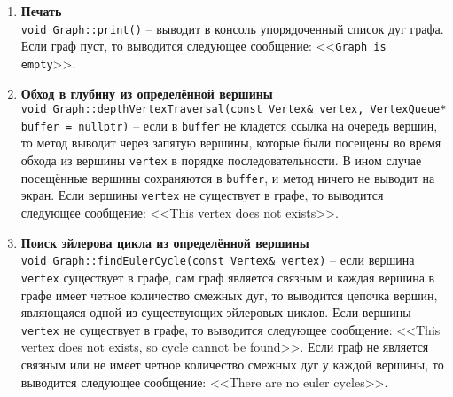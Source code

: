\begin{enumerate}
    \item \textbf{Печать} \\
    \texttt{void Graph::print()} -- выводит в консоль упорядоченный список дуг графа. Если граф пуст, то выводится следующее сообщение: <<\texttt{Graph is empty}>>.

    \item \textbf{Обход в глубину из определённой вершины} \\
    \texttt{void Graph::depthVertexTraversal(const Vertex\& vertex, VertexQueue* buffer = nullptr)} -- если в \texttt{buffer} не кладется ссылка на очередь вершин, то метод выводит через запятую вершины, которые были посещены во время обхода из вершины \texttt{vertex} в порядке последовательности. В ином случае посещённые вершины сохраняются в \texttt{buffer}, и метод ничего не выводит на экран. Если вершины \texttt{vertex} не существует в графе, то выводится следующее сообщение: <<This vertex does not exists>>.

    \item \textbf{Поиск эйлерова цикла из определённой вершины} \\
    \texttt{void Graph::findEulerCycle(const Vertex\& vertex)} -- если вершина \texttt{vertex} существует в графе, сам граф является связным и каждая вершина в графе имеет четное количество смежных дуг, то выводится цепочка вершин, являющаяся одной из существующих эйлеровых циклов. Если вершины \texttt{vertex} не существует в графе, то выводится следующее сообщение: <<This vertex does not exists, so cycle cannot be found>>. Если граф не является связным или не имеет четное количество смежных дуг у каждой вершины, то выводится следующее сообщение: <<There are no euler cycles>>.
\end{enumerate}

\newpage